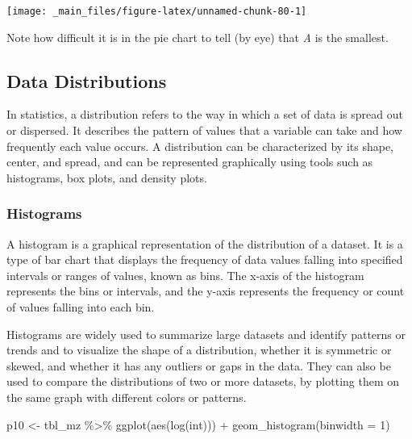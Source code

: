 \documentclass[
]{book}
\newenvironment{Shaded}{\begin{snugshade}}{\end{snugshade}}
\newcommand{\AttributeTok}[1]{\textcolor[rgb]{0.77,0.63,0.00}{#1}}
\newcommand{\DecValTok}[1]{\textcolor[rgb]{0.00,0.00,0.81}{#1}}
\newcommand{\FunctionTok}[1]{\textcolor[rgb]{0.00,0.00,0.00}{#1}}
\newcommand{\NormalTok}[1]{#1}
\newcommand{\OtherTok}[1]{\textcolor[rgb]{0.56,0.35,0.01}{#1}}
\newcommand{\SpecialCharTok}[1]{\textcolor[rgb]{0.00,0.00,0.00}{#1}}
\begin{document}
\begin{center}\texttt{[image: \_main\_files/figure-latex/unnamed-chunk-80-1]} \end{center}

Note how difficult it is in the pie chart to tell (by eye) that \emph{A} is the smallest.

\hypertarget{data-distributions}{%
\subsection{Data Distributions}\label{data-distributions}}

In statistics, a distribution refers to the way in which a set of data is spread out or dispersed. It describes the pattern of values that a variable can take and how frequently each value occurs. A distribution can be characterized by its shape, center, and spread, and can be represented graphically using tools such as histograms, box plots, and density plots.

\hypertarget{histograms}{%
\subsubsection*{Histograms}\label{histograms}}

A histogram is a graphical representation of the distribution of a dataset. It is a type of bar chart that displays the frequency of data values falling into specified intervals or ranges of values, known as bins. The x-axis of the histogram represents the bins or intervals, and the y-axis represents the frequency or count of values falling into each bin.

Histograms are widely used to summarize large datasets and identify patterns or trends and to visualize the shape of a distribution, whether it is symmetric or skewed, and whether it has any outliers or gaps in the data. They can also be used to compare the distributions of two or more datasets, by plotting them on the same graph with different colors or patterns.

\begin{Shaded}
\begin{Highlighting}[]
\NormalTok{p10 }\OtherTok{\textless{}{-}}\NormalTok{ tbl\_mz }\SpecialCharTok{\%\textgreater{}\%} \FunctionTok{ggplot}\NormalTok{(}\FunctionTok{aes}\NormalTok{(}\FunctionTok{log}\NormalTok{(int))) }\SpecialCharTok{+} \FunctionTok{geom\_histogram}\NormalTok{(}\AttributeTok{binwidth =} \DecValTok{1}\NormalTok{)}
\end{Highlighting}
\end{Shaded}
\end{document}
